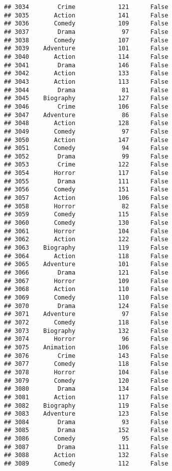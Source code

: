 \documentclass[
]{article}
\begin{document}
\begin{verbatim}
## 3034        Crime            121      False
## 3035       Action            141      False
## 3036       Comedy            109      False
## 3037        Drama             97      False
## 3038       Comedy            107      False
## 3039    Adventure            101      False
## 3040       Action            114      False
## 3041        Drama            146      False
## 3042       Action            133      False
## 3043       Action            113      False
## 3044        Drama             81      False
## 3045    Biography            127      False
## 3046        Crime            106      False
## 3047    Adventure             86      False
## 3048       Action            128      False
## 3049       Comedy             97      False
## 3050       Action            147      False
## 3051       Comedy             94      False
## 3052        Drama             99      False
## 3053        Crime            122      False
## 3054       Horror            117      False
## 3055        Drama            111      False
## 3056       Comedy            151      False
## 3057       Action            106      False
## 3058       Horror             82      False
## 3059       Comedy            115      False
## 3060       Comedy            130      False
## 3061       Horror            104      False
## 3062       Action            122      False
## 3063    Biography            119      False
## 3064       Action            118      False
## 3065    Adventure            101      False
## 3066        Drama            121      False
## 3067       Horror            109      False
## 3068       Action            110      False
## 3069       Comedy            110      False
## 3070        Drama            124      False
## 3071    Adventure             97      False
## 3072       Comedy            118      False
## 3073    Biography            132      False
## 3074       Horror             96      False
## 3075    Animation            106      False
## 3076        Crime            143      False
## 3077       Comedy            118      False
## 3078       Horror            104      False
## 3079       Comedy            120      False
## 3080        Drama            134      False
## 3081       Action            117      False
## 3082    Biography            119      False
## 3083    Adventure            123      False
## 3084        Drama             93      False
## 3085        Drama            152      False
## 3086       Comedy             95      False
## 3087        Drama            111      False
## 3088       Action            132      False
## 3089       Comedy            112      False

\end{verbatim}
\end{document}

